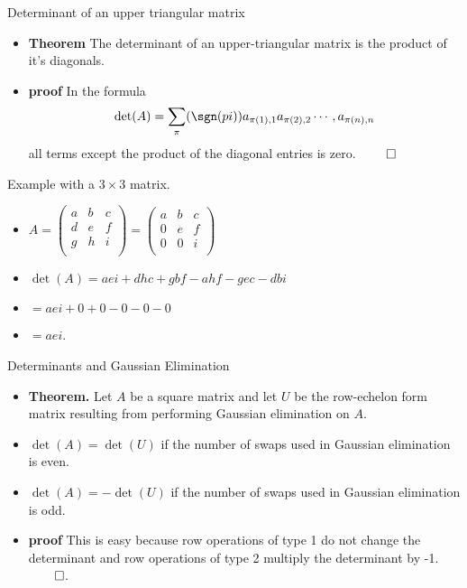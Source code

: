 \documentclass[handout]{beamer}
\begin{document}
\begin{frame}{Determinant of an upper triangular matrix}

\begin{itemize}
\item \textbf{Theorem} The determinant of an upper-triangular matrix
is the product of it's diagonals.
\item \textbf{proof} In the formula
$$
\det(A) = \sum_{\pi} (\sgn(pi)) a_{\pi(1),1} a_{\pi(2), 2} \cdots, a_{\pi(n), n}
$$
all terms except the product of the diagonal entries is zero. $\qed$
\end{itemize}
\end{frame}


\begin{frame}{Example with a $3\times 3$ matrix.}

\begin{itemize}
\item
$
A=
\begin{pmatrix}
a & b & c\\
d & e & f \\
g & h & i \\
\end{pmatrix}
=
\begin{pmatrix}
a & b & c\\
0 & e & f \\
0 & 0 & i \\
\end{pmatrix}
$
\item
$\det(A) = aei + dhc + gbf - ahf - gec - dbi$
\item
$= aei + 0 + 0 - 0 - 0 -0$
\item $=aei$.
\end{itemize}
\end{frame}


\begin{frame}{Determinants and Gaussian Elimination}
\begin{itemize}
\item \textbf{Theorem.} Let $A$ be a square matrix and let $U$ be
the row-echelon form matrix resulting from performing Gaussian elimination
on $A$.
\item $\det(A) = \det(U)$ if the number of swaps used in Gaussian elimination
is even.
\item $\det(A) = -\det(U)$ if the number of swaps used in Gaussian elimination is odd.
\item \textbf{proof} This is easy because row operations of type 1 do not
change the determinant and row operations of type 2 multiply the determinant by -1. $\qed$.
\end{itemize}
\end{frame}
\end{document}
